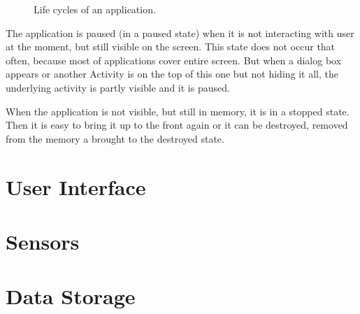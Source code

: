 \begin{figure}[h!]
    \caption{Life cycles of an application.}
\end{figure}

The application is paused (in a paused state) when it is not interacting with user at the moment, but still visible on the screen.
This state does not occur that often, because most of applications cover entire screen.
But when a dialog box appears or another Activity is on the top of this one but not hiding it all, the underlying activity is partly visible and it is paused.

When the application is not visible, but still in memory, it is in a stopped state.
Then it is easy to bring it up to the front again or it can be destroyed, removed from the memory a brought to the destroyed state.

\section{User Interface}



\section{Sensors}

\section{Data Storage}




